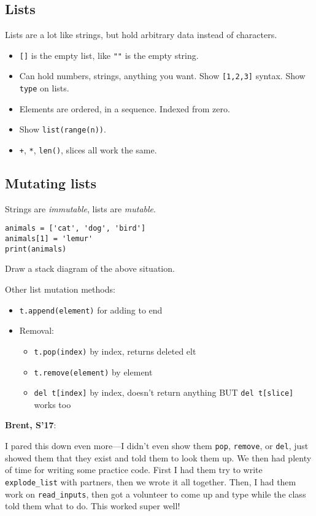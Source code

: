 \documentclass{article}
\newenvironment{reflect}[1]
{
  \noindent
  \begin{lrbox}{\reflectbox}
    \begin{minipage}[t]{\textwidth}
      \textbf{#1}:
}{
    \end{minipage}
  \end{lrbox}
  \fbox{\usebox{\reflectbox}}
}
\begin{document}
\subsection*{Lists}

Lists are a lot like strings, but hold arbitrary data instead of
characters.
\begin{itemize}
\item \verb|[]| is the empty list, like \verb|""| is the empty string.
\item Can hold numbers, strings, anything you want.  Show
  \verb|[1,2,3]| syntax.  Show \verb|type| on lists.
\item Elements are ordered, in a sequence.  Indexed from zero.
\item Show \verb|list(range(n))|.
\item \verb|+|, \verb|*|, \verb|len()|, slices all work the same.
\end{itemize}

\subsection*{Mutating lists}

Strings are \emph{immutable}, lists are \emph{mutable}.

\begin{verbatim}
animals = ['cat', 'dog', 'bird']
animals[1] = 'lemur'
print(animals)
\end{verbatim}
Draw a stack diagram of the above situation.

Other list mutation methods:
\begin{itemize}
\item \verb|t.append(element)| for adding to end
\item Removal:
  \begin{itemize}
  \item \verb|t.pop(index)| by index, returns deleted elt
  \item \verb|t.remove(element)| by element
  \item \verb|del t[index]| by index, doesn't return anything BUT
	\verb|del t[slice]| works too
  \end{itemize}
\end{itemize}

\begin{reflect}{Brent, S'17}
  I pared this down even more---I didn't even show them \verb|pop|,
  \verb|remove|, or \verb|del|, just showed them that they exist and
  told them to look them up.  We then had plenty of time for writing
  some practice code.  First I had them try to write
  \verb|explode_list| with partners, then we wrote it all together.
  Then, I had them work on \verb|read_inputs|, then got a volunteer to
  come up and type while the class told them what to do.  This worked
  super well!
\end{reflect}
\end{document}
